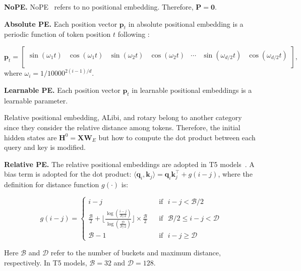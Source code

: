 \documentclass{article} \usepackage{iclr2025_conference,times}
\begin{document}
\textbf{NoPE.} NoPE~\citep{kazemnejad2024impact} refers to no positional embedding. Therefore, $\boldsymbol{P}=\boldsymbol{0}$.


\textbf{Absolute PE.} Each position vector $\boldsymbol{p}_t$ in absolute positional embedding is a periodic function of token position $t$ following \citet{vaswani2017attention}:

\begin{equation}
    \boldsymbol{p}_t=\begin{bmatrix}
        \sin(\omega_1 t) & \cos(\omega_1 t)  & \sin(\omega_2 t) & \cos(\omega_2 t) & \cdots & \sin(\omega_{d/2} t)& \cos(\omega_{d/2} t)\\
    \end{bmatrix}\textrm{,}
\end{equation}
where $\omega_i=1/\textrm{10000}^{2(i-1)/d}$. 

\textbf{Learnable PE.} Each position vector $\boldsymbol{p}_t$ in learnable positional embeddings is a learnable parameter.

Relative positional embedding, ALibi, and rotary belong to another category since they consider the relative distance among tokens. Therefore, the initial hidden states are $\boldsymbol{H}^0=\boldsymbol{X}\boldsymbol{W}_E$ but how to compute the dot product between each query and key is modified. 

\textbf{Relative PE.} The relative positional embeddings are adopted in T5 models~\citep{raffel2020exploring}. A bias term is adopted for the dot product: $\langle\boldsymbol{q}_i\textrm{,}\,\boldsymbol{k}_j\rangle=\boldsymbol{q}_i\boldsymbol{k}_j^\top+g(i-j)$, where the definition for distance function $g(\cdot)$ is:

\begin{equation}
    g(i-j)=\left\{
    \begin{array}{lcl}
        i-j & &\textrm{if} \,\,\,\, i-j < \mathcal{B}/2 \\
        \frac{\mathcal{B}}{2} + \lfloor\frac{\log(\frac{i-j}{\mathcal{B}/2})}{\log(\frac{\mathcal{D}}{\mathcal{B}/2})}\rfloor\times \frac{\mathcal{B}}{2} && \textrm{if} \,\,\,\, \mathcal{B}/2 \leq i-j < \mathcal{D}\\
        \mathcal{B}-1 && \textrm{if} \,\,\,\, i-j\geq\mathcal{D}
    \end{array}
    \right.
\end{equation}

Here $\mathcal{B}$ and $\mathcal{D}$ refer to the number of buckets and maximum distance, respectively. In T5 models, $\mathcal{B}=\textrm{32}$ and $\mathcal{D}=\textrm{128}$.
\end{document}
